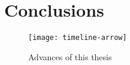\chapter{Conclusions} \label{ch:conclusion}




\begin{figure}[h]
  \centering
  \texttt{[image: timeline-arrow]}
    \caption{Advances of this thesis}
\end{figure}
